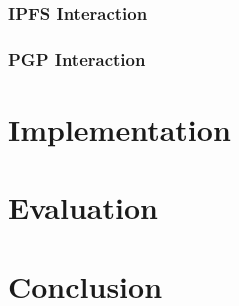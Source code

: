 \documentclass[12pt,a4paper]{report}
\begin{document}
	\subsection{IPFS Interaction}
	
	\subsection{PGP Interaction}
	
	\chapter{Implementation}
	
	\chapter{Evaluation}
	
	\chapter{Conclusion}
	
	
	
\end{document}
